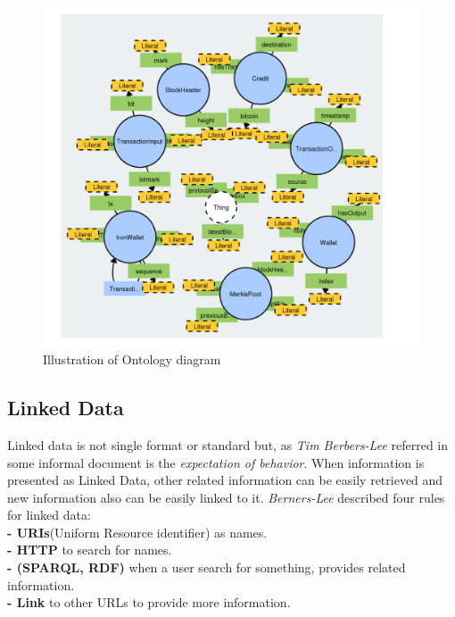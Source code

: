 \begin{center}
	
	
	\begin{figure}[htb!]
		
		\begin{minipage}{0.55\linewidth}
			\centering
			\includegraphics[width=1.65\textwidth]{images/chap02_diagram_ontology.png}
		\end{minipage}
		\caption[Illustration of Ontology diagram]{Illustration of Ontology diagram\cite{Matthew}}
		
		
	\end{figure}
	
\end{center}

\subsection{Linked Data}
Linked data is not single format or standard but, as \textit{Tim Berbers-Lee} referred in some informal document is the \textit{expectation of behavior}. When information
is presented as Linked Data, other related information can be easily retrieved and new information also can be easily linked to it. \textit{Berners-Lee} described four rules for linked data:\\
\textbf{- URIs}(Uniform Resource identifier) as names.\\ 
\textbf{- HTTP} to search for names.\\
\textbf{- (SPARQL, RDF)}  when a user search for something, provides related information.\\
\textbf{- Link} to other URLs to provide more information\cite{Hector}.\\

